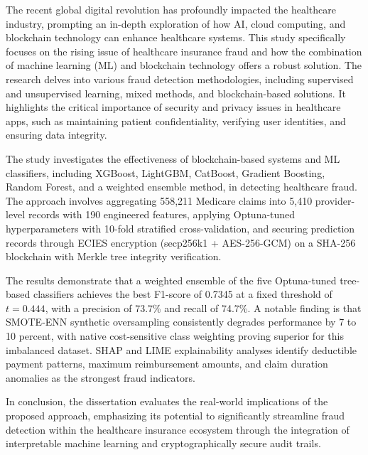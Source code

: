 \documentclass[12pt,a4paper,oneside]{report}
\begin{document}
\hspace{0.5in}The recent global digital revolution has profoundly impacted the healthcare industry, prompting an in-depth exploration of how AI, cloud computing, and blockchain technology can enhance healthcare systems. This study specifically focuses on the rising issue of healthcare insurance fraud and how the combination of machine learning (ML) and blockchain technology offers a robust solution. The research delves into various fraud detection methodologies, including supervised and unsupervised learning, mixed methods, and blockchain-based solutions. It highlights the critical importance of security and privacy issues in healthcare apps, such as maintaining patient confidentiality, verifying user identities, and ensuring data integrity.

\hspace{0.5in}The study investigates the effectiveness of blockchain-based systems and ML classifiers, including XGBoost, LightGBM, CatBoost, Gradient Boosting, Random Forest, and a weighted ensemble method, in detecting healthcare fraud. The approach involves aggregating 558,211 Medicare claims into 5,410 provider-level records with 190 engineered features, applying Optuna-tuned hyperparameters with 10-fold stratified cross-validation, and securing prediction records through ECIES encryption (secp256k1 + AES-256-GCM) on a SHA-256 blockchain with Merkle tree integrity verification.

\hspace{0.5in}The results demonstrate that a weighted ensemble of the five Optuna-tuned tree-based classifiers achieves the best F1-score of 0.7345 at a fixed threshold of $t=0.444$, with a precision of 73.7\% and recall of 74.7\%. A notable finding is that SMOTE-ENN synthetic oversampling consistently degrades performance by 7 to 10 percent, with native cost-sensitive class weighting proving superior for this imbalanced dataset. SHAP and LIME explainability analyses identify deductible payment patterns, maximum reimbursement amounts, and claim duration anomalies as the strongest fraud indicators.

\hspace{0.5in}In conclusion, the dissertation evaluates the real-world implications of the proposed approach, emphasizing its potential to significantly streamline fraud detection within the healthcare insurance ecosystem through the integration of interpretable machine learning and cryptographically secure audit trails.

\vspace{1cm}
\end{document}
